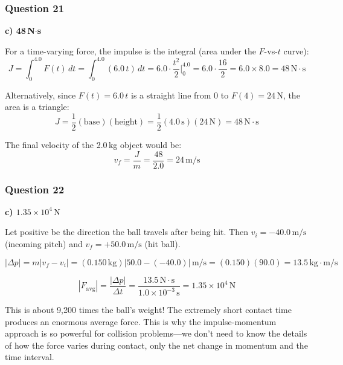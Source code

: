 \documentclass[12pt,letterpaper]{article}
\begin{document}
\subsubsection*{Question 21}

\begin{answerbox}
\textbf{c) 48\,N$\cdot$s}
\end{answerbox}

\begin{explanationbox}
For a time-varying force, the impulse is the integral (area under the $F$-vs-$t$ curve):
\[
J = \int_0^{4.0} F(t)\,dt = \int_0^{4.0} (6.0\,t)\,dt = 6.0 \cdot \frac{t^2}{2}\bigg|_0^{4.0} = 6.0 \cdot \frac{16}{2} = 6.0 \times 8.0 = 48\,\text{N}\cdot\text{s}
\]

Alternatively, since $F(t) = 6.0\,t$ is a straight line from 0 to $F(4) = 24\,\text{N}$, the area is a triangle:
\[
J = \frac{1}{2}(\text{base})(\text{height}) = \frac{1}{2}(4.0\,\text{s})(24\,\text{N}) = 48\,\text{N}\cdot\text{s}
\]

The final velocity of the 2.0\,kg object would be:
\[
v_f = \frac{J}{m} = \frac{48}{2.0} = 24\,\text{m/s}
\]
\end{explanationbox}

\subsubsection*{Question 22}

\begin{answerbox}
\textbf{c) $1.35 \times 10^4\,\text{N}$}
\end{answerbox}

\begin{explanationbox}
Let positive be the direction the ball travels after being hit. Then $v_i = -40.0\,\text{m/s}$ (incoming pitch) and $v_f = +50.0\,\text{m/s}$ (hit ball).

\[
|\Delta p| = m|v_f - v_i| = (0.150\,\text{kg})|50.0 - (-40.0)|\,\text{m/s} = (0.150)(90.0) = 13.5\,\text{kg}\cdot\text{m/s}
\]

\[
|F_{\text{avg}}| = \frac{|\Delta p|}{\Delta t} = \frac{13.5\,\text{N}\cdot\text{s}}{1.0 \times 10^{-3}\,\text{s}} = 1.35 \times 10^4\,\text{N}
\]

This is about 9,200 times the ball's weight! The extremely short contact time produces an enormous average force. This is why the impulse-momentum approach is so powerful for collision problems---we don't need to know the details of how the force varies during contact, only the net change in momentum and the time interval.
\end{explanationbox}
\end{document}

